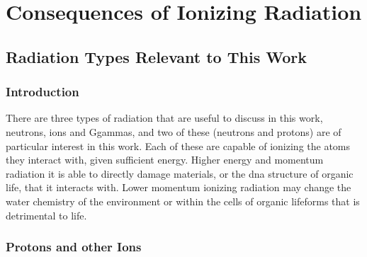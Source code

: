 \chapter{Consequences of Ionizing Radiation}
\label{chap:backgroundsources}

\begin{changemargin}{1.0cm}{1.0cm}
\end{changemargin}





\section{Radiation Types Relevant to This Work}


\subsection{Introduction}

There are three types of radiation that are useful to discuss in this work, neutrons, ions and Ggammas, and two of these (neutrons and protons) are of particular interest in this work.  Each of these are capable of ionizing the atoms they interact with, given sufficient energy.  Higher energy and momentum radiation it is able to directly damage materials, or the \acrshort{dna} structure of organic life, that it interacts with.  Lower momentum ionizing radiation may change the water chemistry of the environment or within the cells of organic lifeforms that is detrimental to life.



\subsection{Protons and other Ions}

